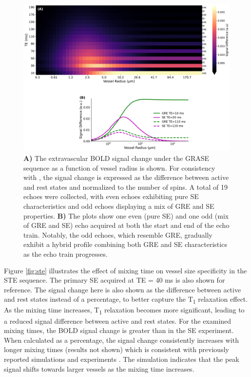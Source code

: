 \begin{figure}[!htbp]
    \centering
    \includegraphics[width=\textwidth]{fig5_grase.pdf}
    \caption{ \textbf{A)} The extravascular BOLD signal change under the GRASE sequence as a function of vessel radius is shown. For consistency with \cite{scheffler2021bold}, the signal change is expressed as the difference between active and rest states and normalized to the number of spins. A total of 19 echoes were collected, with even echoes exhibiting pure SE characteristics and odd echoes displaying a mix of GRE and SE properties. \textbf{B)} The plots show one even (pure SE) and one odd (mix of GRE and SE) echo acquired at both the start and end of the echo train. Notably, the odd echoes, which resemble GRE, gradually exhibit a hybrid profile combining both GRE and SE characteristics as the echo train progresses.}
    \label{fig:grase}
\end{figure}

Figure \ref{fig:ste} illustrates the effect of mixing time on vessel size specificity in the STE sequence. The primary SE acquired at TE = 40 ms is also shown for reference. The signal change here is also shown as the difference between active and rest states instead of a percentage, to better capture the T\textsubscript{1} relaxation effect. As the mixing time increases, T\textsubscript{1} relaxation becomes more significant, leading to a reduced signal difference between active and rest states. For the examined mixing times, the BOLD signal change is greater than in the SE experiment. When calculated as a percentage, the signal change consistently increases with longer mixing times (results not shown) which is consistent with previously reported simulations and experiments \cite{goerke2006increased}. The simulation indicates that the peak signal shifts towards larger vessels as the mixing time increases.

